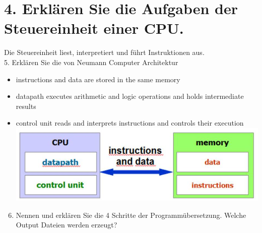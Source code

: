 \documentclass[10pt]{article}
\begin{document}
\section*{4. Erklären Sie die Aufgaben der Steuereinheit einer CPU.}
Die Steuereinheit liest, interpretiert und führt Instruktionen aus.\\
5. Erklären Sie die von Neumann Computer Architektur

\begin{itemize}
  \item instructions and data are stored in the same memory
  \item datapath executes arithmetic and logic operations and holds intermediate results
  \item control unit reads and interprets instructions and controls their execution\\
\includegraphics[width=\linewidth]{images/2025_01_02_f240dc33b50f25226887g-2}
\end{itemize}

\begin{enumerate}
  \setcounter{enumi}{5}
  \item Nennen und erklären Sie die 4 Schritte der Programmübersetzung. Welche Output Dateien werden erzeugt?
\end{enumerate}
\end{document}
